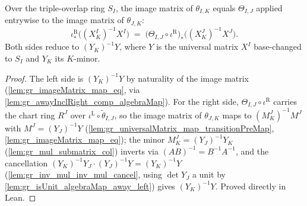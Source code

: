 \begin{lemma}\leanok
  \label{lem:gr_cocycle_imageMatrix_eq}
  Over the triple-overlap ring \(S_I\), the image matrix of \(\theta_{I,K}\)
  equals \(\Theta_{I,J}\) applied entrywise to the image matrix of
  \(\theta_{J,K}\):
  \[
    \iota^{\mathrm{R}}_\ast\bigl((X^I_K)^{-1} X^I\bigr)
      \;=\;
      \bigl(\Theta_{I,J}\circ\iota^{\mathrm{R}}\bigr)_\ast
        \bigl((X^J_K)^{-1} X^J\bigr) .
  \]
  Both sides reduce to \((Y_K)^{-1} Y\), where \(Y\) is the universal matrix
  \(X^I\) base-changed to \(S_I\) and \(Y_K\) its \(K\)-minor.
\end{lemma}
\begin{proof}

\leanok
  The left side is \((Y_K)^{-1} Y\) by naturality of the image matrix
  (\cref{lem:gr_imageMatrix_map_eq}, via \cref{lem:gr_awayInclRight_comp_algebraMap}).
  For the right side, \(\Theta_{I,J}\circ\iota^{\mathrm{R}}\) carries the chart
  ring \(R^J\) over \(\iota^{\mathrm{L}}\circ\tilde\theta_{I,J}\), so the image
  matrix of \(\theta_{J,K}\) maps to \((M^J_K)^{-1} M^J\) with
  \(M^J = (Y_J)^{-1} Y\) (\cref{lem:gr_universalMatrix_map_transitionPreMap},
  \cref{lem:gr_imageMatrix_map_eq}); the minor \(M^J_K = (Y_J)^{-1} Y_K\)
  (\cref{lem:gr_mul_submatrix_col}) inverts via \((AB)^{-1} = B^{-1}A^{-1}\), and
  the cancellation \((Y_K)^{-1} Y_J \cdot (Y_J)^{-1} Y = (Y_K)^{-1} Y\)
  (\cref{lem:gr_inv_mul_inv_mul_cancel}, using \(\det Y_J\) a unit by
  \cref{lem:gr_isUnit_algebraMap_away_left}) gives \((Y_K)^{-1} Y\). Proved
  directly in Lean.
\end{proof}

